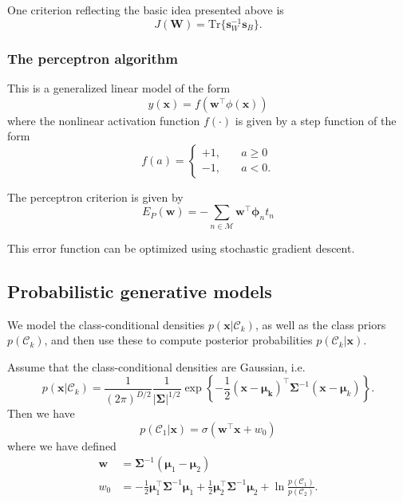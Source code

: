\documentclass[a4paper]{book}
\newcommand{\up}{\mathrm}
\renewcommand{\bf}{\mathbf}
\renewcommand{\cal}{\mathcal}
\newcommand{\bs}{\boldsymbol}
\begin{document}
One criterion reflecting the basic idea presented above is
\begin{equation}
	J(\bf{W}) = \up{Tr}\{ \bf{s}_W^{-1} \bf{s}_B \}.
\end{equation}
\subsubsection{The perceptron algorithm}
This is a generalized linear model of the form
\begin{equation}
	y(\bf{x}) = f(\bf{w}^{\intercal} \phi(\bf{x}))
\end{equation}
where the nonlinear activation function $f(\cdot)$ is given by a step function of the form
\begin{equation}
	f(a) = \begin{cases}
		+1, \quad & a \geq 0 \\
		-1, \quad & a < 0.
	\end{cases}
\end{equation}

The perceptron criterion is given by
\begin{equation}
	E_P(\bf{w}) = - \sum_{n \in \cal{M}} \bf{w}^{\intercal} \bs{\phi}_n t_n
\end{equation}

This error function can be optimized using stochastic gradient descent.
\subsection{Probabilistic generative models}
We model the class-conditional densities $p(\bf{x}|\cal{C}_k)$, as well as the class priors $p(\cal{C}_k)$, and then use these to compute posterior probabilities $p(\cal{C}_k|\bf{x})$.

Assume that the class-conditional densities are Gaussian, i.e.
\begin{equation}
	p(\bf{x}|\cal{C}_k) = \frac{1}{(2\pi)^{D/2}}\frac{1}{|\bf{\Sigma}|^{1/2}}\exp \left\{ -\frac{1}{2}(\bf{x}-\bs{\mu_k})^{\intercal} \bf{\Sigma}^{-1} (\bf{x}-\bs{\mu}_k) \right\}.
\end{equation}
Then we have
\begin{equation}
	p(\cal{C}_1|\bf{x}) = \sigma(\bf{w}^{\intercal} \bf{x} + w_0)
\end{equation}
where we have defined
\begin{align}
	\bf{w} &= \bf{\Sigma}^{-1} (\bs{\mu}_1 - \bs{\mu}_2) \\
	w_0 &= -\frac{1}{2} \bs{\mu}_1^{\intercal} \bs{\Sigma}^{-1} \bs{\mu}_1 + \frac{1}{2} \bs{\mu}_2^{\intercal} \bs{\Sigma}^{-1} \bs{\mu}_2+\ln \frac{p(\cal{C}_1)}{p(\cal{C}_2)}.
\end{align}
\end{document}
